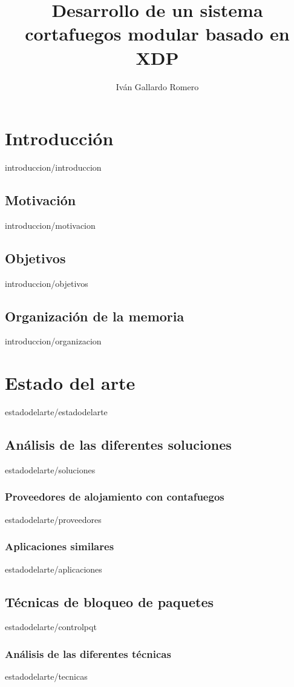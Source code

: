 \documentclass[epsbased,copyright,final,printable,covers,extendedindex,firstnumbered,tfg,gnuplot]{tfgtfmthesisuam}
\title{Desarrollo de un sistema cortafuegos modular basado en XDP }
\author{Iván Gallardo Romero}
\begin{document}
\chapter{Introducción\label{CAP:INTRODUCCION}}{introduccion/introduccion}
 \section{Motivación\label{SEC:MOTIVACION}}{introduccion/motivacion}
 \section{Objetivos\label{SEC:OBJETIVOS}}{introduccion/objetivos}
 \section{Organización de la memoria\label{SEC:ORGANIZACION}}{introduccion/organizacion}
 
 
\chapter{Estado del arte\label{CAP:ESTADODELARTE}}{estadodelarte/estadodelarte}
    \section{Análisis de las diferentes soluciones\label{SEC:SOLUCIONES}}{estadodelarte/soluciones}
                \subsection{Proveedores de alojamiento con contafuegos\label{SEC:EAAS}}{estadodelarte/proveedores}
                \subsection{Aplicaciones similares\label{SEC:EAaplicacionesS}}{estadodelarte/aplicaciones}
    \section{Técnicas de bloqueo de paquetes\label{SEC:controlpqt}}{estadodelarte/controlpqt}
        \subsection{Análisis de las diferentes técnicas\label{SEC:NETFILTER}}{estadodelarte/tecnicas}
\end{document}
